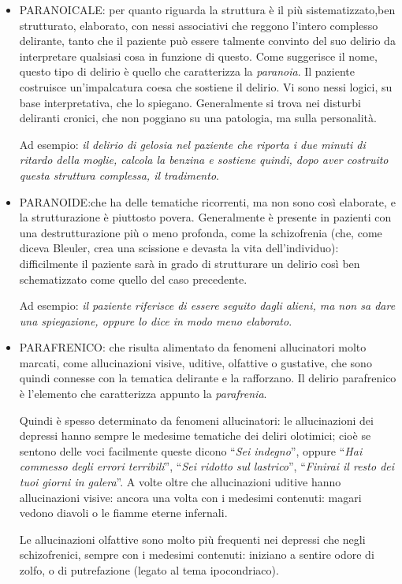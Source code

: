 \begin{itemize}
\item
  PARANOICALE: per quanto riguarda la struttura è il più
  sistematizzato,ben strutturato, elaborato, con nessi associativi che
  reggono l'intero complesso delirante, tanto che il paziente può essere
  talmente convinto del suo delirio da interpretare qualsiasi cosa in
  funzione di questo. Come suggerisce il nome, questo tipo di delirio è
  quello che caratterizza la \emph{paranoia}. Il paziente costruisce
  un'impalcatura coesa che sostiene il delirio. Vi sono nessi logici, su
  base interpretativa, che lo spiegano. Generalmente si trova nei
  disturbi deliranti cronici, che non poggiano su una patologia, ma
  sulla personalità.

Ad esempio: \emph{il delirio di gelosia nel paziente che riporta i due
minuti di ritardo della moglie, calcola la benzina e sostiene quindi,
dopo aver costruito questa struttura complessa, il tradimento}.

\item
  PARANOIDE:che ha delle tematiche ricorrenti, ma non sono così
  elaborate, e la strutturazione è piuttosto povera. Generalmente è
  presente in pazienti con una destrutturazione più o meno profonda,
  come la schizofrenia (che, come diceva Bleuler, crea una scissione e
  devasta la vita dell'individuo): difficilmente il paziente sarà in
  grado di strutturare un delirio così ben schematizzato come quello del
  caso precedente.

Ad esempio: \emph{il paziente riferisce di essere seguito dagli alieni,
ma non sa dare una spiegazione, oppure lo dice in modo meno elaborato}.

\item
  PARAFRENICO: che risulta alimentato da fenomeni allucinatori molto
  marcati, come allucinazioni visive, uditive, olfattive o gustative,
  che sono quindi connesse con la tematica delirante e la rafforzano. Il
  delirio parafrenico è l'elemento che caratterizza appunto la
  \emph{parafrenia}.

  Quindi è spesso determinato da fenomeni allucinatori: le allucinazioni
  dei depressi hanno sempre le medesime tematiche dei deliri olotimici;
  cioè se sentono delle voci facilmente queste dicono ``\emph{Sei
  indegno}'', oppure ``\emph{Hai commesso degli errori terribili}'',
  ``\emph{Sei ridotto sul lastrico}'', ``\emph{Finirai il resto dei tuoi
  giorni in galera}''. A volte oltre che allucinazioni uditive hanno
  allucinazioni visive: ancora una volta con i medesimi contenuti:
  magari vedono diavoli o le fiamme eterne infernali.

Le allucinazioni olfattive sono molto più frequenti nei depressi che
negli schizofrenici, sempre con i medesimi contenuti: iniziano a sentire
odore di zolfo, o di putrefazione (legato al tema ipocondriaco).
\end{itemize}

